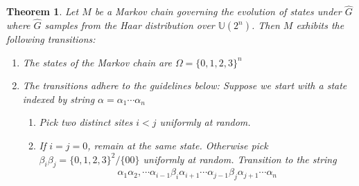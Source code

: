 \documentclass[12pt]{amsart}
\newtheorem{theorem}{Theorem}[section]
\theoremstyle{definition}
\theoremstyle{remark}
\numberwithin{equation}{section}
\theoremstyle{remark}
\begin{document}
\begin{theorem} \label{haarevol}
  Let $M$ be a Markov chain governing the evolution of states under $\widehat{G}$ where $\widehat{G}$ samples from the Haar distribution over $\mathbb{U}(2^n)$. Then $M$ exhibits the following transitions:
  \begin{enumerate}
    \item The states of the Markov chain are $\Omega = \{0,1,2,3\}^n$
    \item The transitions adhere to the guidelines below: Suppose we start with a state indexed by string $\alpha = \alpha_1\cdots\alpha_n$
      \begin{enumerate}
        \item Pick two distinct sites $i < j$ uniformly at random.
        \item If $i = j = 0$, remain at the same state. Otherwise pick $\beta_i\beta_j = \{0,1,2,3\}^2/\{00\}$ uniformly at random. Transition to the string
        $$\alpha_1\alpha_2,\cdots\alpha_{i-1}\beta_i\alpha_{i+1}\cdots \alpha_{j-1}\beta_{j}\alpha_{j+1}\cdots\alpha_n$$
      \end{enumerate}
  \end{enumerate}
\end{theorem}
\end{document}
